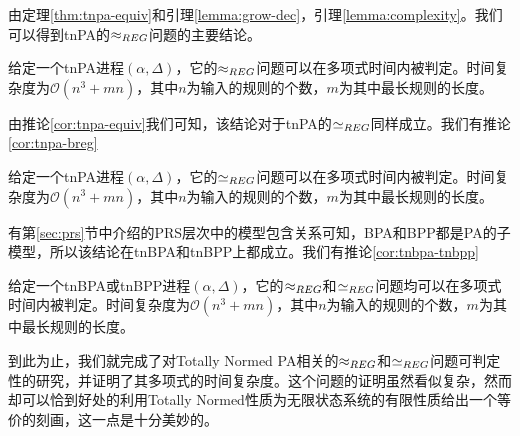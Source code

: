 由定理\ref{thm:tnpa-equiv}和引理\ref{lemma:grow-dec}，引理\ref{lemma:complexity}。我们可以得到tnPA的$\approx_{REG}$问题的主要结论。

\begin{thm}\label{thm:tnpa-wreg}
给定一个tnPA进程$(\alpha,\Delta)$，它的$\approx_{REG}$问题可以在多项式时间内被判定。时间复杂度为$\mathcal{O}(n^3+mn)$，其中$n$为输入的规则的个数，$m$为其中最长规则的长度。
\end{thm}

由推论\ref{cor:tnpa-equiv}我们可知，该结论对于tnPA的$\simeq_{REG}$同样成立。我们有推论\ref{cor:tnpa-breg}

\begin{cor}\label{cor:tnpa-breg}
给定一个tnPA进程$(\alpha,\Delta)$，它的$\simeq_{REG}$问题可以在多项式时间内被判定。时间复杂度为$\mathcal{O}(n^3+mn)$，其中$n$为输入的规则的个数，$m$为其中最长规则的长度。
\end{cor}

有第\ref{sec:prs}节中介绍的PRS层次中的模型包含关系可知，BPA和BPP都是PA的子模型，所以该结论在tnBPA和tnBPP上都成立。我们有推论\ref{cor:tnbpa-tnbpp}

\begin{cor}\label{cor:tnbpa-tnbpp}
给定一个tnBPA或tnBPP进程$(\alpha,\Delta)$，它的$\approx_{REG}$和$\simeq_{REG}$问题均可以在多项式时间内被判定。时间复杂度为$\mathcal{O}(n^3+mn)$，其中$n$为输入的规则的个数，$m$为其中最长规则的长度。
\end{cor}

到此为止，我们就完成了对Totally Normed PA相关的$\approx_{REG}$和$\simeq_{REG}$问题可判定性的研究，并证明了其多项式的时间复杂度。这个问题的证明虽然看似复杂，然而却可以恰到好处的利用Totally Normed性质为无限状态系统的有限性质给出一个等价的刻画，这一点是十分美妙的。
